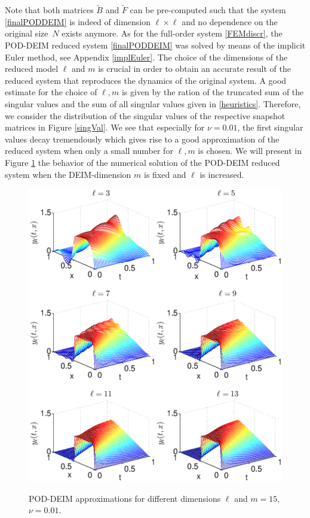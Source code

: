 Note that both matrices $\tilde{B}$ and $\tilde{F} $ can be pre-computed such that the system \eqref{finalPODDEIM} is indeed of dimension $\ell \times \ell$ and no dependence on the original \mbox{size $N$} exists anymore. As for the full-order system \eqref{FEMdiscr}, the POD-DEIM reduced system \eqref{finalPODDEIM} was solved by means of the implicit Euler method, see Appendix \ref{implEuler}. The choice of the dimensions of the reduced model $\ell$ and $m$ is crucial in order to obtain an accurate result of the reduced system that reproduces the dynamics of the original system. A good estimate for the choice of $\ell,m$ is given by the ration of the truncated sum of the singular values and the sum of all singular values given in \eqref{heuristics}. Therefore, we consider the distribution of the singular values of the respective snapshot matrices in Figure \ref{singVal}. We see that especially for $\nu = 0.01$, the first singular values decay tremendously which gives rise to a good approximation of the reduced system when only a small number for $\ell,m$ is chosen. We will present in Figure \ref{PODplot} the behavior of the numerical solution of the POD-DEIM reduced system when the DEIM-dimension $m$ is fixed and $\ell$ is increased.
\newpage
\begin{figure}[H]
  \centering
  \includegraphics[width=\textwidth]{plots/PODplot_lnew.eps}\\
  \caption{POD-DEIM approximations for different dimensions $\ell$ and $m = 15$, $\nu = 0.01$.}\label{PODplot}
\end{figure}
